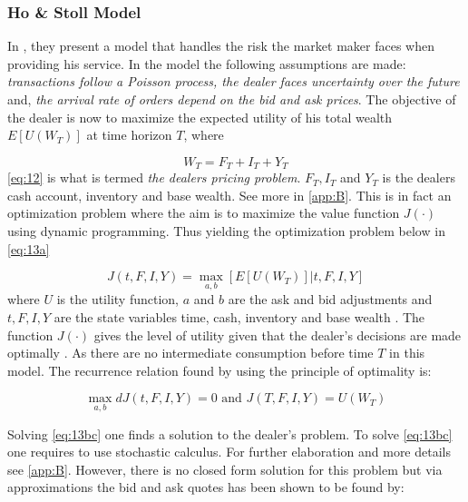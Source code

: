 \documentclass{kththesis}
\theoremstyle{definition}
\begin{document}
\subsubsection*{Ho \& Stoll Model}
In \textcite{ho1981optimal}, they present a model that handles the risk the market maker faces when providing his service. In the model the following assumptions are made: \textit{transactions follow a Poisson process, the dealer faces uncertainty over the future} and, \textit{the arrival rate of orders depend on the bid and ask prices}. The objective of the dealer is now to maximize the expected utility of his total wealth $E[U(W_T)]$ at time horizon $T$, where 

\begin{equation}
    \label{eq:12}
    W_{T} = F_{T} + I_{T} + Y_{T}
\end{equation}
\autoref{eq:12} is what is termed \textit{the dealers pricing problem}. $F_{T}, I_{T}$ and $Y_{T}$ is the dealers cash account, inventory and base wealth. See more in \autoref{app:B}. This is in fact an optimization problem where the aim is to maximize the value function $J(\cdot)$ using dynamic programming. Thus yielding the optimization problem below in \autoref{eq:13a}

\begin{equation}
    \label{eq:13a}
    J(t,F,I,Y) = \underset{a,b}{\max}[E[U(W_T)] | t,F,I,Y]
\end{equation}
where $U$ is the utility function, $a$ and $b$ are the ask and bid adjustments and $t, F, I,Y$ are the state variables time, cash, inventory and base wealth \parencite{o1995market}. The function $J(\cdot)$ gives the level of utility given that the dealer's decisions are made optimally \parencite{o1995market}. As there are no intermediate consumption before time $T$ in this model. The recurrence relation found by using the principle of optimality is:

\begin{equation}
    \label{eq:13bc}
    \underset{a,b}{\max}dJ(t,F,I,Y)=0 \text{ and } 
    J(T,F,I,Y)=U(W_T)
\end{equation}

Solving \autoref{eq:13bc} one finds a solution to the dealer's problem. To solve \autoref{eq:13bc} one requires to use stochastic calculus. For further elaboration and more details see \autoref{app:B}. However, there is no closed form solution for this problem but via approximations the bid and ask quotes has been shown to be found by:
\end{document}
